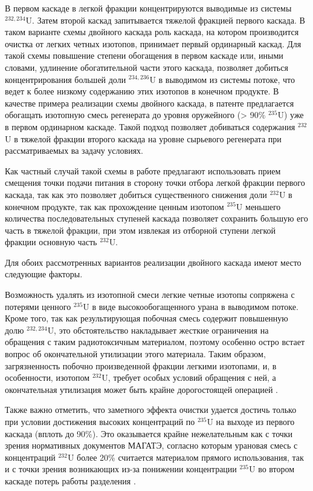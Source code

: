 В первом каскаде в легкой фракции концентрируются выводимые из системы $^{232,234}$U. Затем второй каскад запитывается тяжелой фракцией первого каскада. В таком варианте схемы двойного каскада роль каскада, на котором производится очистка от легких четных изотопов, принимает первый ординарный каскад. Для такой схемы повышение степени обогащения в первом каскаде или, иными словами, удлинение обогатительной части этого каскада, позволяет добиться концентрирования большей доли $^{234,236}$U в выводимом из системы потоке, что ведет к более низкому содержанию этих изотопов в конечном продукте. В качестве примера реализации схемы двойного каскада, в патенте \cite{vodolazskihSposobIzotopnogoVosstanovleniya} предлагается обогащать изотопную смесь регенерата до уровня оружейного (> 90\% $^{235}$U) уже в первом ординарном каскаде. Такой подход позволяет добиваться содержания $^{232}$U в тяжелой фракции второго каскада на уровне сырьевого регенерата при рассматриваемых ва задачу условиях.

Как частный случай такой схемы в работе \cite{palkinOchistkaRegenerirovannogoGeksaftorida2013} предлагают использовать прием смещения точки подачи питания в сторону точки отбора легкой фракции первого каскада, так как это позволяет добиться существенного снижения доли $^{232}$U в конечном продукте, так как прохождение ценным изотопом $^{235}$U меньшего количества последовательных ступеней каскада позволяет сохранить большую его часть в тяжелой фракции, при этом извлекая из отборной ступени легкой фракции основную часть $^{232}$U. 

Для обоих рассмотренных вариантов реализации двойного каскада имеют место следующие факторы.

Возможность удалять из изотопной смеси легкие четные изотопы сопряжена с потерями ценного $^{235}$U в виде высокообогащенного урана в выводимом потоке. Кроме того, так как результирующая побочная смесь содержит повышенную долю $^{232,234}$U, это обстоятельство накладывает жесткие ограничения на обращения с таким радиотоксичным материалом, поэтому особенно остро встает вопрос об окончательной утилизации этого материала. Таким образом, загрязненность побочно произведенной фракции легкими изотопами, и, в особенности, изотопом $^{232}$U, требует особых условий обращения с ней, а окончательная утилизация может быть крайне дорогостоящей операцией \cite{smirnovApplyingEnrichmentCapacities2018}.

Также важно отметить, что заметного эффекта очистки удается достичь только при условии достижения высоких концентраций по $^{235}$U на выходе из первого каскада (вплоть до 90\%). Это оказывается крайне нежелательным как с точки зрения нормативных документов МАГАТЭ, согласно которым урановая смесь с концентраций $^{232}$U более 20\% считается материалом прямого использования, так и с точки зрения возникающих из-за понижении концентрации  $^{235}$U во втором каскаде потерь работы разделения \cite{ManagementHighEnriched2005}.

